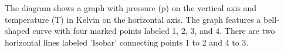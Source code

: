 The diagram shows a graph with pressure (p) on the vertical axis and temperature (T) in Kelvin on the horizontal axis. The graph features a bell-shaped curve with four marked points labeled 1, 2, 3, and 4. There are two horizontal lines labeled 'Isobar' connecting points 1 to 2 and 4 to 3.
